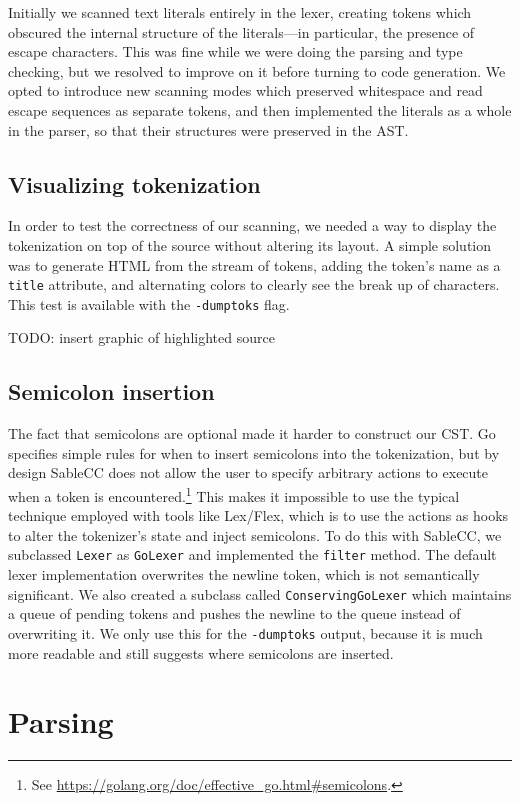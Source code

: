 \documentclass[oneside]{article}
\begin{document}
Initially we scanned text literals entirely in the lexer, creating tokens which obscured the internal structure of the literals---in particular, the presence of escape characters. This was fine while we were doing the parsing and type checking, but we resolved to improve on it before turning to code generation. We opted to introduce new scanning modes which preserved whitespace and read escape sequences as separate tokens, and then implemented the literals as a whole in the parser, so that their structures were preserved in the AST.

\subsection{Visualizing tokenization}
In order to test the correctness of our scanning, we needed a way to display the tokenization on top of the source without altering its layout. A simple solution was to generate HTML from the stream of tokens, adding the token's name as a \verb|title| attribute, and alternating colors to clearly see the break up of characters. This test is available with the \verb|-dumptoks| flag.

TODO: insert graphic of highlighted source

\subsection{Semicolon insertion}\label{subsec:semicolons}
The fact that semicolons are optional made it harder to construct our CST. Go specifies simple rules for when to insert semicolons into the tokenization, but by design SableCC does not allow the user to specify arbitrary actions to execute when a token is encountered.\footnote{See \url{https://golang.org/doc/effective_go.html\#semicolons}.} This makes it impossible to use the typical technique employed with tools like Lex/Flex, which is to use the actions as hooks to alter the tokenizer's state and inject semicolons. To do this with SableCC, we subclassed \verb|Lexer| as \verb|GoLexer| and implemented the \verb|filter| method. The default lexer implementation overwrites the newline token, which is not semantically significant. We also created a subclass called \texttt{ConservingGoLexer} which maintains a queue of pending tokens and pushes the newline to the queue instead of overwriting it. We only use this for the \texttt{-dumptoks} output, because it is much more readable and still suggests where semicolons are inserted.

\section{Parsing}
\end{document}
